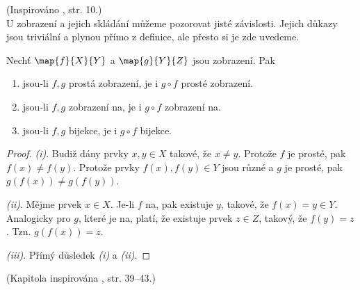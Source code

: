 (Inspirováno \cite{Becvar2019}, str. 10.)\\
U zobrazení a jejich skládání můžeme pozorovat jisté závislosti. Jejich důkazy jsou triviální a plynou přímo z definice, ale přesto si je zde uvedeme.
\begin{lemma}
    Nechť $\map{f}{X}{Y}$ a $\map{g}{Y}{Z}$ jsou zobrazení. Pak
    \begin{enumerate}[label=(\roman*)]
        \item jsou-li $f,g$ prostá zobrazení, je i $g\circ f$ prosté zobrazení.
        \item jsou-li $f,g$ zobrazení na, je i $g\circ f$ zobrazení na.
        \item jsou-li $f,g$ bijekce, je i $g\circ f$ bijekce.
    \end{enumerate}
\end{lemma}
\begin{proof}
    \textit{(i)}. Budiž dány prvky $x,y\in X$ takové, že $x\neq y$. Protože $f$ je prosté, pak $f(x)\neq f(y)$. Protože prvky $f(x),f(y)\in Y$ jsou různé a $g$ je prosté, pak $g(f(x))\neq g(f(y))$.\par
    \textit{(ii)}. Mějme prvek $x\in X$. Je-li $f$ na, pak existuje $y$, takové, že $f(x)=y\in Y$. Analogicky pro $g$, které je na, platí, že existuje prvek $z\in Z$, takový, že $f(y)=z$. Tzn. $g(f(x))=z$.\par
    \textit{(iii)}. Přímý důsledek \textit{(i)} a \textit{(ii)}.
\end{proof}
(Kapitola inspirována \cite{MatousekNesetril2009}, str. 39--43.)

